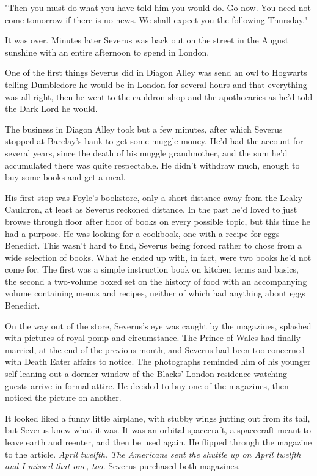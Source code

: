 \documentclass[a4paper,11pt]{article}
\begin{document}
"Then you must do what you have told him you would do. Go now. You need not come tomorrow if there is no news. We shall expect you the following Thursday."

It was over. Minutes later Severus was back out on the street in the August sunshine with an entire afternoon to spend in London.

One of the first things Severus did in Diagon Alley was send an owl to Hogwarts telling Dumbledore he would be in London for several hours and that everything was all right, then he went to the cauldron shop and the apothecaries as he'd told the Dark Lord he would.

The business in Diagon Alley took but a few minutes, after which Severus stopped at Barclay's bank to get some muggle money. He'd had the account for several years, since the death of his muggle grandmother, and the sum he'd accumulated there was quite respectable. He didn't withdraw much, enough to buy some books and get a meal.

His first stop was Foyle's bookstore, only a short distance away from the Leaky Cauldron, at least as Severus reckoned distance. In the past he'd loved to just browse through floor after floor of books on every possible topic, but this time he had a purpose. He was looking for a cookbook, one with a recipe for eggs Benedict. This wasn't hard to find, Severus being forced rather to chose from a wide selection of books. What he ended up with, in fact, were two books he'd not come for. The first was a simple instruction book on kitchen terms and basics, the second a two-volume boxed set on the history of food with an accompanying volume containing menus and recipes, neither of which had anything about eggs Benedict.

On the way out of the store, Severus's eye was caught by the magazines, splashed with pictures of royal pomp and circumstance. The Prince of Wales had finally married, at the end of the previous month, and Severus had been too concerned with Death Eater affairs to notice. The photographs reminded him of his younger self leaning out a dormer window of the Blacks' London residence watching guests arrive in formal attire. He decided to buy one of the magazines, then noticed the picture on another.

It looked liked a funny little airplane, with stubby wings jutting out from its tail, but Severus knew what it was. It was an orbital spacecraft, a spacecraft meant to leave earth and reenter, and then be used again. He flipped through the magazine to the article. \emph{April twelfth. The Americans sent the shuttle up on April twelfth and I missed that one, too.} Severus purchased both magazines.
\end{document}
